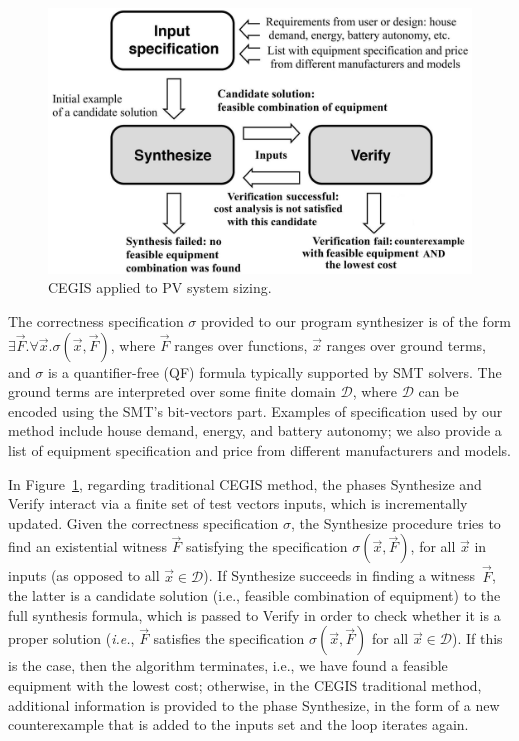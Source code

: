 \documentclass[journal]{IEEEtran}
\begin{document}
\begin{figure}[h]
	\centering
	\includegraphics[width=0.75\columnwidth]{fig2_rev2.jpg}
	\caption{CEGIS applied to PV system sizing.}
	\label{Counter-Example-Guided-Inductive-Synthesis}
\end{figure}

The correctness specification $\sigma$ provided to our program synthesizer is of the form $\exists \vec{F} .  \forall \vec{x}.  \sigma(\vec{x}, \vec{F})$, where $\vec{F}$ ranges over functions, $\vec{x}$ ranges over ground terms, and $\sigma$ is a quantifier-free (QF) formula typically supported by SMT solvers. The ground terms are interpreted over some finite domain $\mathcal{D}$, where $\mathcal{D}$ can be encoded using the SMT's bit-vectors part. Examples of specification used by our method include house demand, energy, and battery autonomy; we also provide a list of equipment specification and price from different manufacturers and models.

In Figure~\ref{Counter-Example-Guided-Inductive-Synthesis}, regarding traditional CEGIS method, the phases {\sc Synthesize} and {\sc Verify} interact via a finite set of test vectors {\sc inputs}, which is incrementally updated. Given the correctness specification $\sigma$, the {\sc Synthesize} procedure tries to find an existential witness $\vec{F}$ satisfying the specification $\sigma(\vec{x}, \vec{F})$, for all $\vec{x}$ in {\sc inputs} (as opposed to all $\vec{x} \in \mathcal{D}$). If {\sc Synthesize} succeeds in finding a witness~$\vec{F}$, the latter is a candidate solution (i.e., feasible combination of equipment) to the full synthesis formula, which is passed to {\sc Verify} in order to check whether it is a proper solution ({\it i.e.}, $\vec{F}$ satisfies the specification $\sigma(\vec{x}, \vec{F})$ for all $\vec{x}\in\mathcal{D}$). If this is the case, then the algorithm terminates, i.e., we have found a feasible equipment with the lowest cost; otherwise, in the CEGIS traditional method, additional information is provided to the phase {\sc Synthesize}, in the form of a new counterexample that is added to the {\sc inputs} set and the loop iterates again.
\end{document}
